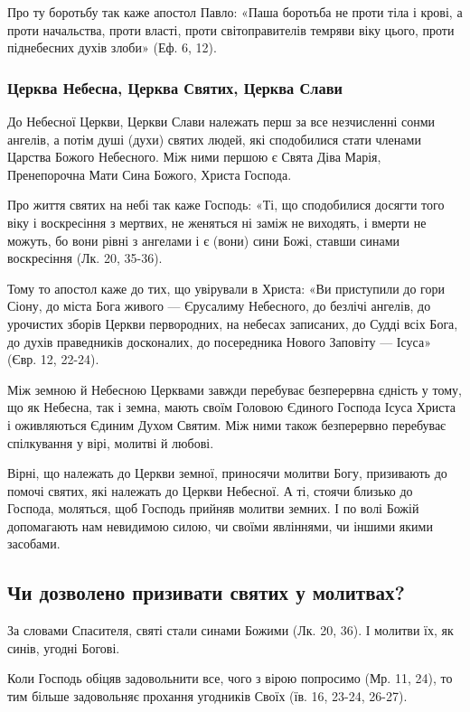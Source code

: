 \documentclass[main.tex]{subfiles}
\begin{document}
Про ту боротьбу так каже апостол Павло: «Паша боротьба не проти тіла і крові, а проти начальства, проти власті, проти світоправителів темряви віку цього, проти піднебесних духів злоби» (Еф. 6, 12).

\subsubsection{Церква Небесна, Церква Святих, Церква Слави}

До Небесної Церкви, Церкви Слави належать перш за все незчисленні сонми ангелів, а потім душі (духи) святих людей, які сподобилися стати членами Царства Божого Небесного. Між ними першою є Свята Діва Марія, Пренепорочна Мати Сина Божого, Христа Господа.

Про життя святих на небі так каже Господь: «Ті, що сподобилися досягти того віку і воскресіння з мертвих, не женяться ні заміж не виходять, і вмерти не можуть, бо вони рівні з ангелами і є (вони) сини Божі, ставши синами воскресіння (Лк. 20, 35-36).

Тому то апостол каже до тих, що увірували в Христа: «Ви приступили до гори Сіону, до міста Бога живого — Єрусалиму Небесного, до безлічі ангелів, до урочистих зборів Церкви первородних, на небесах записаних, до Судді всіх Бога, до духів праведників досконалих, до посередника Нового Заповіту — Ісуса» (Євр. 12, 22-24).

Між земною й Небесною Церквами завжди перебуває безперервна єдність у тому, що як Небесна, так і земна, мають своїм Головою Єдиного Господа Ісуса Христа і оживляються Єдиним Духом Святим. Між ними також безперервно перебуває спілкування у вірі, молитві й любові.
 
Вірні, що належать до Церкви земної, приносячи молитви Богу, призивають до помочі святих, які належать до Церкви Небесної. А ті, стоячи близько до Господа, моляться, щоб Господь прийняв молитви земних. І по волі Божій допомагають нам невидимою силою, чи своїми явліннями, чи іншими якими засобами.

\subsection{Чи дозволено призивати святих у молитвах?}

За словами Спасителя, святі стали синами Божими (Лк. 20, 36). І молитви їх, як синів, угодні Богові.

Коли Господь обіцяв задовольнити все, чого з вірою попросимо (Мр. 11, 24), то тим більше задовольняє прохання угодників Своїх (їв. 16, 23-24, 26-27).
\end{document}
